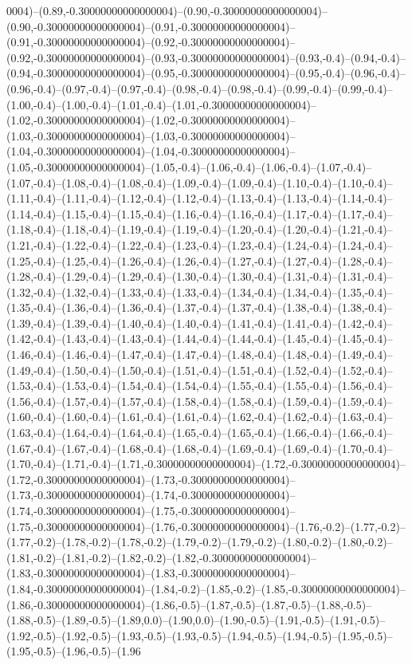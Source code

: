 0004)--(0.89,-0.30000000000000004)--(0.90,-0.30000000000000004)--(0.90,-0.30000000000000004)--(0.91,-0.30000000000000004)--(0.91,-0.30000000000000004)--(0.92,-0.30000000000000004)--(0.92,-0.30000000000000004)--(0.93,-0.30000000000000004)--(0.93,-0.4)--(0.94,-0.4)--(0.94,-0.30000000000000004)--(0.95,-0.30000000000000004)--(0.95,-0.4)--(0.96,-0.4)--(0.96,-0.4)--(0.97,-0.4)--(0.97,-0.4)--(0.98,-0.4)--(0.98,-0.4)--(0.99,-0.4)--(0.99,-0.4)--(1.00,-0.4)--(1.00,-0.4)--(1.01,-0.4)--(1.01,-0.30000000000000004)--(1.02,-0.30000000000000004)--(1.02,-0.30000000000000004)--(1.03,-0.30000000000000004)--(1.03,-0.30000000000000004)--(1.04,-0.30000000000000004)--(1.04,-0.30000000000000004)--(1.05,-0.30000000000000004)--(1.05,-0.4)--(1.06,-0.4)--(1.06,-0.4)--(1.07,-0.4)--(1.07,-0.4)--(1.08,-0.4)--(1.08,-0.4)--(1.09,-0.4)--(1.09,-0.4)--(1.10,-0.4)--(1.10,-0.4)--(1.11,-0.4)--(1.11,-0.4)--(1.12,-0.4)--(1.12,-0.4)--(1.13,-0.4)--(1.13,-0.4)--(1.14,-0.4)--(1.14,-0.4)--(1.15,-0.4)--(1.15,-0.4)--(1.16,-0.4)--(1.16,-0.4)--(1.17,-0.4)--(1.17,-0.4)--(1.18,-0.4)--(1.18,-0.4)--(1.19,-0.4)--(1.19,-0.4)--(1.20,-0.4)--(1.20,-0.4)--(1.21,-0.4)--(1.21,-0.4)--(1.22,-0.4)--(1.22,-0.4)--(1.23,-0.4)--(1.23,-0.4)--(1.24,-0.4)--(1.24,-0.4)--(1.25,-0.4)--(1.25,-0.4)--(1.26,-0.4)--(1.26,-0.4)--(1.27,-0.4)--(1.27,-0.4)--(1.28,-0.4)--(1.28,-0.4)--(1.29,-0.4)--(1.29,-0.4)--(1.30,-0.4)--(1.30,-0.4)--(1.31,-0.4)--(1.31,-0.4)--(1.32,-0.4)--(1.32,-0.4)--(1.33,-0.4)--(1.33,-0.4)--(1.34,-0.4)--(1.34,-0.4)--(1.35,-0.4)--(1.35,-0.4)--(1.36,-0.4)--(1.36,-0.4)--(1.37,-0.4)--(1.37,-0.4)--(1.38,-0.4)--(1.38,-0.4)--(1.39,-0.4)--(1.39,-0.4)--(1.40,-0.4)--(1.40,-0.4)--(1.41,-0.4)--(1.41,-0.4)--(1.42,-0.4)--(1.42,-0.4)--(1.43,-0.4)--(1.43,-0.4)--(1.44,-0.4)--(1.44,-0.4)--(1.45,-0.4)--(1.45,-0.4)--(1.46,-0.4)--(1.46,-0.4)--(1.47,-0.4)--(1.47,-0.4)--(1.48,-0.4)--(1.48,-0.4)--(1.49,-0.4)--(1.49,-0.4)--(1.50,-0.4)--(1.50,-0.4)--(1.51,-0.4)--(1.51,-0.4)--(1.52,-0.4)--(1.52,-0.4)--(1.53,-0.4)--(1.53,-0.4)--(1.54,-0.4)--(1.54,-0.4)--(1.55,-0.4)--(1.55,-0.4)--(1.56,-0.4)--(1.56,-0.4)--(1.57,-0.4)--(1.57,-0.4)--(1.58,-0.4)--(1.58,-0.4)--(1.59,-0.4)--(1.59,-0.4)--(1.60,-0.4)--(1.60,-0.4)--(1.61,-0.4)--(1.61,-0.4)--(1.62,-0.4)--(1.62,-0.4)--(1.63,-0.4)--(1.63,-0.4)--(1.64,-0.4)--(1.64,-0.4)--(1.65,-0.4)--(1.65,-0.4)--(1.66,-0.4)--(1.66,-0.4)--(1.67,-0.4)--(1.67,-0.4)--(1.68,-0.4)--(1.68,-0.4)--(1.69,-0.4)--(1.69,-0.4)--(1.70,-0.4)--(1.70,-0.4)--(1.71,-0.4)--(1.71,-0.30000000000000004)--(1.72,-0.30000000000000004)--(1.72,-0.30000000000000004)--(1.73,-0.30000000000000004)--(1.73,-0.30000000000000004)--(1.74,-0.30000000000000004)--(1.74,-0.30000000000000004)--(1.75,-0.30000000000000004)--(1.75,-0.30000000000000004)--(1.76,-0.30000000000000004)--(1.76,-0.2)--(1.77,-0.2)--(1.77,-0.2)--(1.78,-0.2)--(1.78,-0.2)--(1.79,-0.2)--(1.79,-0.2)--(1.80,-0.2)--(1.80,-0.2)--(1.81,-0.2)--(1.81,-0.2)--(1.82,-0.2)--(1.82,-0.30000000000000004)--(1.83,-0.30000000000000004)--(1.83,-0.30000000000000004)--(1.84,-0.30000000000000004)--(1.84,-0.2)--(1.85,-0.2)--(1.85,-0.30000000000000004)--(1.86,-0.30000000000000004)--(1.86,-0.5)--(1.87,-0.5)--(1.87,-0.5)--(1.88,-0.5)--(1.88,-0.5)--(1.89,-0.5)--(1.89,0.0)--(1.90,0.0)--(1.90,-0.5)--(1.91,-0.5)--(1.91,-0.5)--(1.92,-0.5)--(1.92,-0.5)--(1.93,-0.5)--(1.93,-0.5)--(1.94,-0.5)--(1.94,-0.5)--(1.95,-0.5)--(1.95,-0.5)--(1.96,-0.5)--(1.96